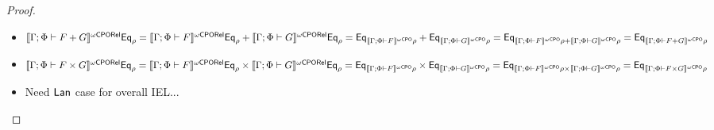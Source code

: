 \documentclass[acmsmall,review,anonymous]{acmart}
\theoremstyle{definition}
\begin{document}
\begin{proof}
\begin{itemize}
\begin{itemize}
{\color{red} The inductive case of \eqref{eq:helper} for limit
  ordinals is proved by:

\begin{align*}
&\;\;\;\; T^{\bigcup_{j<i}j}_{G, \Eq_{\rho}[\phi :=
      T^{i}_{H,\Eq_{\rho}} K_0][\overline{\alpha := \Eq_A}]}\,K_0\\
&= (\colim{j < i}{T^{j}_{G, \Eq_{\rho}[\phi :=
      T^{i}_{H,\Eq_{\rho}} K_0][\overline{\alpha := \Eq_A}]}})\,K_0\\
&= \colim{j < i}{(T^{j}_{G, \Eq_{\rho}[\phi :=
      T^{i}_{H,\Eq_{\rho}} K_0][\overline{\alpha := \Eq_A}]}\,K_0)}\\
&= \colim{j<i}{(T^{j}_{G, \Eq_{\rho}[\phi := \Eq_{(T^{\oCPO}_{H,\rho})^i
          K_0}][\overline{\alpha := \Eq_A}]}\,K_0)}\\
&= (\colim{j<i}{T^{j}_{G, \Eq_{\rho}[\phi := \Eq_{(T^{\oCPO}_{H,\rho})^i
          K_0}][\overline{\alpha := \Eq_A}]}})\,K_0\\
&= T^{\bigcup_{j<i}j}_{G, \Eq_{\rho}[\phi := \Eq_{(T^{\oCPO}_{H,\rho})^i
        K_0}][\overline{\alpha := \Eq_A}]}\,K_0
\end{align*}
} Here, the second and fourth equalitues hold by Lemma~2
of~{\color{red} [Johann and Polonsky 2019]}, and trhe third holds by
the induction hypothesis.


\item {\color{blue} Finally, the $\Lan$ case for (2) is proved by...}


\end{itemize}
\item $\llbracket{\Gamma; \Phi \vdash F + G}\rrbracket^{{\omega\mathsf{CPORel}}} \mathsf{Eq}_{\rho} =
  \llbracket{\Gamma; \Phi \vdash F}\rrbracket^{{\omega\mathsf{CPORel}}} \mathsf{Eq}_{\rho} + \llbracket{\Gamma;
    \Phi \vdash G}\rrbracket^{{\omega\mathsf{CPORel}}} \mathsf{Eq}_{\rho} = \mathsf{Eq}_{\llbracket{\Gamma; \Phi \vdash
      F}\rrbracket^{{\omega\mathsf{CPO}}}\rho} + \mathsf{Eq}_{\llbracket{\Gamma; \Phi \vdash G}\rrbracket^{{\omega\mathsf{CPO}}}\rho} =
  \mathsf{Eq}_{\llbracket{\Gamma; \Phi \vdash F}\rrbracket^{{\omega\mathsf{CPO}}}\rho + \llbracket{\Gamma; \Phi
      \vdash G}\rrbracket^{{\omega\mathsf{CPO}}}\rho} = \mathsf{Eq}_{\llbracket{\Gamma; \Phi \vdash F +
      G}\rrbracket^{{\omega\mathsf{CPO}}}\rho}$
\item $\llbracket{\Gamma; \Phi \vdash F \times G}\rrbracket^{{\omega\mathsf{CPORel}}} \mathsf{Eq}_{\rho} =
  \llbracket{\Gamma; \Phi \vdash F}\rrbracket^{{\omega\mathsf{CPORel}}}\mathsf{Eq}_{\rho} \times \llbracket{\Gamma;
    \Phi \vdash G}\rrbracket^{{\omega\mathsf{CPORel}}}\mathsf{Eq}_{\rho} = \mathsf{Eq}_{\llbracket{\Gamma; \Phi \vdash
      F}\rrbracket^{{\omega\mathsf{CPO}}}\rho} \times \mathsf{Eq}_{\llbracket{\Gamma; \Phi \vdash G}\rrbracket^{{\omega\mathsf{CPO}}}\rho}
  = \mathsf{Eq}_{\llbracket{\Gamma; \Phi \vdash F}\rrbracket^{{\omega\mathsf{CPO}}}\rho \times
    \llbracket{\Gamma; \Phi \vdash G}\rrbracket^{{\omega\mathsf{CPO}}}\rho} = \mathsf{Eq}_{\llbracket{\Gamma;
      \Phi \vdash F \times G}\rrbracket^{{\omega\mathsf{CPO}}}\rho}$
\item {\color{blue} Need $\Lan$ case for overall IEL...}
\end{itemize}
\end{proof}
\end{document}

